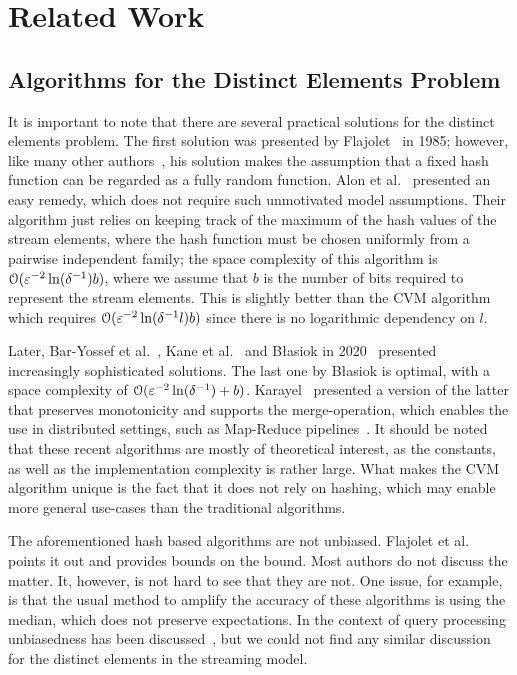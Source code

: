 \section{Related Work}\label{sec:related_work}
\subsection{Algorithms for the Distinct Elements Problem}
It is important to note that there are several practical solutions for the distinct elements problem.
The first solution was presented by Flajolet~\cite{flajolet1985} in 1985; however, like many other authors~\cite{flajolet2007,heule2013,pettie2021}, his solution makes the assumption that a fixed hash function can be regarded as a fully random function.
Alon et al.~\cite[Section 2.3]{alon1999} presented an easy remedy, which does not require such unmotivated model assumptions.
Their algorithm just relies on keeping track of the maximum of the hash values of the stream elements, where the hash function must be chosen uniformly from a pairwise independent family; the space complexity of this algorithm is $\operatorname{\mathcal O}(\varepsilon^{-2} \ln (\delta^{-1}) b)$, where we assume that $b$ is the number of bits required to represent the stream elements.
This is slightly better than the CVM algorithm which requires $\operatorname{\mathcal O}(\varepsilon^{-2} \ln (\delta^{-1}l) b)$ since there is no logarithmic dependency on $l$.

Later, Bar-Yossef et al.~\cite{baryossef2002}, Kane et al.~\cite{kane2010} and B\l{}asiok in 2020~\cite{blasiok2020} presented increasingly sophisticated solutions.
The last one by B\l{}asiok is optimal, with a space complexity of $\operatorname{\mathcal O}(\varepsilon^{-2} \ln (\delta^{-1}) + b)$.
Karayel~\cite{karayel2023} presented a version of the latter that preserves monotonicity and supports the merge-operation, which enables the use in distributed settings, such as Map-Reduce pipelines~\cite{dean2010}.
It should be noted that these recent algorithms are mostly of theoretical interest, as the constants, as well as the implementation complexity is rather large.
What makes the CVM algorithm unique is the fact that it does not rely on hashing, which may enable more general use-cases than the traditional algorithms.

The aforementioned hash based algorithms are not unbiased.
Flajolet et al.~\cite{flajolet1985} points it out and provides bounds on the bound.
Most authors do not discuss the matter.
It, however, is not hard to see that they are not.
One issue, for example, is that the usual method to amplify the accuracy of these algorithms is using the median, which does not preserve expectations.
In the context of query processing unbiasedness has been discussed~\cite[Section 2.1]{haas1995}, but we could not find any similar discussion for the distinct elements in the streaming model.

